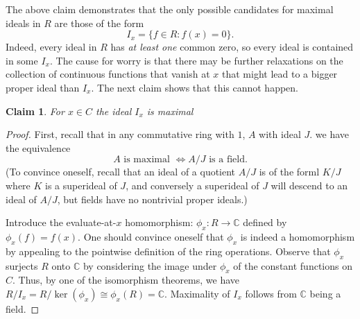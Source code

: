 \documentclass[18pt]{amsart}
\newcommand{\C}{\mathbb{C}}
\newtheorem{claim}{Claim}
\begin{document}
The above claim demonstrates that the only possible candidates for maximal ideals in $R$ are those of the form
	\begin{equation*}
		I_x=\{f \in R:f(x)=0\}.
	\end{equation*}
Indeed, every ideal in $R$ has \emph{at least one} common zero, so every ideal is contained in some $I_x$. The cause for worry is that there may be further relaxations on the collection of continuous functions that vanish at $x$ that might lead to a bigger proper ideal than $I_x$. The next claim shows that this cannot happen.
	\begin{claim} 
		For $x \in C$ the ideal $I_x$ is maximal 
	\end{claim}
	\begin{proof}
		First, recall that in any commutative ring with $1$, $A$ with ideal $J$. we have the equivalence
		\begin{equation*}
			A \text{ is maximal } \iff  A/J \text{ is a field}.
		\end{equation*}
		(To convince oneself, recall that an ideal of a quotient $A/J$ is of the forml $K/J$ where $K$ is a superideal of $J$, and conversely a superideal of $J$ will descend to an ideal of $A/J$, but fields have no nontrivial proper ideals.)
		
	Introduce the evaluate-at-$x$ homomorphism: $\phi_x : R \to \C$ defined by $\phi_x (f)=f(x)$. One should convince oneself that $\phi_x$ is indeed a homomorphism by appealing to the pointwise definition of the ring operations. Observe that $\phi_x$ surjects $R$ onto $\C$ by considering the image under $\phi_x$ of the constant functions on $C$. Thus, by one of the isomorphism theorems, we have $R/I_x=R/\ker(\phi_x) \cong \phi_x(R)=\C $. Maximality of $I_x$ follows from $\C$ being a field.
	\end{proof} 
\end{document}
